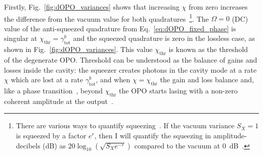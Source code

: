 Firstly, Fig.~\ref{fig:dOPO_variances} shows that increasing $\chi$ from zero increases the difference from the vacuum value for both quadratures~\footnote{There are various ways to quantify squeezing~\cite{}. If the vacuum variance $S_X=1$ is squeezed by a factor $e^r$, then I will quantify the squeezing in amplitude-decibels (dB) as $20 \log_{10}(\sqrt{S_X e^{-r}})$ compared to the vacuum at 0~dB~\cite{}.}. %
The $\Omega=0$ (DC) value of the anti-squeezed quadrature from Eq.~\ref{eq:dOPO_fixed_phase} is singular at $\chi_\text{thr}=\gamma^b_\text{tot}$ and the squeezed quadrature is zero in the lossless case, as shown in Fig.~\ref{fig:dOPO_variances}. %
This value $\chi_\text{thr}$ is known as the threshold~\cite{} of the degenerate OPO. %
Threshold can be understood as the balance of gains and losses inside the cavity: the squeezer creates photons in the cavity mode at a rate $\chi$ which are lost at a rate $\gamma^b_\text{tot}$, and when $\chi=\chi_\text{thr}$ the gain and loss balance and, like a phase transition~\cite{}, beyond $\chi_\text{thr}$ the OPO starts lasing with a non-zero coherent amplitude at the output~\cite{}. %
